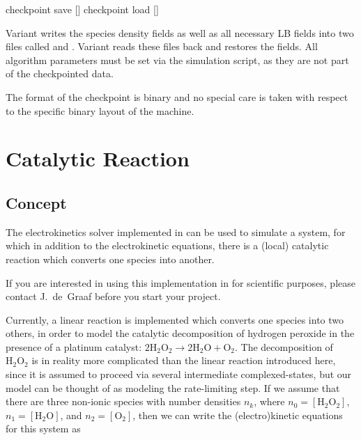 \begin{essyntax}
   checkpoint save []
   checkpoint load []
  \begin{features}
  \end{features}
\end{essyntax}
Variant  writes the species density fields as well as all necessary 
LB fields into two files called  and .
Variant  reads these files back and restores the fields. All 
algorithm parameters must be set via the simulation script, as they are not 
part of the checkpointed data.

The format of the checkpoint is binary and no special care is taken with 
respect to the specific binary layout of the machine.

\section{Catalytic Reaction}

\subsection{Concept}

The electrokinetics solver implemented in \es{} can be used to
simulate a system, for which in addition to the electrokinetic
equations, there is a (local) catalytic reaction which converts one
species into another.

If you are interested in using this implementation in \es{} for
scientific purposes, please contact J.~de~Graaf before you start your
project.

Currently, a linear reaction is implemented which converts one species into two others, in
order to model the catalytic decomposition of hydrogen peroxide in the presence
of a platinum catalyst: $2 \mathrm{H}_{2}\mathrm{O}_{2} \rightarrow 
2 \mathrm{H}_{2}\mathrm{O} + \mathrm{O}_{2}$. The decomposition of 
$\mathrm{H}_{2}\mathrm{O}_{2}$ is in reality more complicated than the linear 
reaction introduced here, since it is assumed to proceed via several intermediate complexed-states, 
but our model can be thought of as modeling the rate-limiting step.
If we assume that there are three non-ionic species with number densities
$n_{k}$, where $n_{0} = [ \mathrm{H}_{2}\mathrm{O}_{2} ]$,
$n_{1} = [ \mathrm{H}_{2}\mathrm{O} ]$, and $n_{2} = [ \mathrm{O}_{2} ]$, 
then we can write the (electro)kinetic equations for this system as

